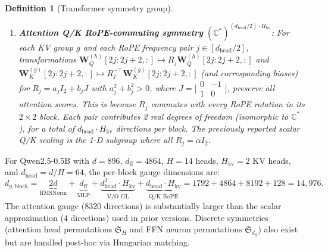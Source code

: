 \documentclass{article}
\newtheorem{definition}[theorem]{Definition}
\newcommand{\bW}{\mathbf{W}}
\begin{document}
\begin{definition}[Transformer symmetry group]
\begin{enumerate}
    \item \textbf{Attention Q/K RoPE-commuting symmetry} $(\mathbb{C}^*)^{(d_\text{head}/2) \cdot H_{\text{kv}}}$: For each KV group $g$ and each RoPE frequency pair $j \in [d_\text{head}/2]$, transformations $\bW_Q^{(h)}[2j{:}2j{+}2,:] \mapsto R_j \bW_Q^{(h)}[2j{:}2j{+}2,:]$ and $\bW_K^{(g)}[2j{:}2j{+}2,:] \mapsto R_j^{-\top}\bW_K^{(g)}[2j{:}2j{+}2,:]$ (and corresponding biases) for $R_j = a_j I_2 + b_j J$ with $a_j^2 + b_j^2 > 0$, where $J = \bigl[\begin{smallmatrix}0 & -1\\1 & 0\end{smallmatrix}\bigr]$, preserve all attention scores.  This is because $R_j$ commutes with every RoPE rotation in its $2 \times 2$ block.  Each pair contributes 2 real degrees of freedom (isomorphic to $\mathbb{C}^*$), for a total of $d_\text{head} \cdot H_{\text{kv}}$ directions per block.  The previously reported scalar Q/K scaling is the 1-D subgroup where all $R_j = \alpha I_2$.
\end{enumerate}
\end{definition}

For Qwen2.5-0.5B with $d = 896$, $d_\text{ff} = 4864$, $H=14$ heads, $H_{\text{kv}}=2$ KV heads, and $d_\text{head} = d/H = 64$, the per-block gauge dimensions are:
\begin{equation}\label{eq:gauge-count}
    d_{g,\text{block}} = \underbrace{2d}_{\text{RMSNorm}} + \underbrace{d_\text{ff}}_{\text{MLP}} + \underbrace{d_\text{head}^2 \cdot H_{\text{kv}}}_{\text{V/O GL}} + \underbrace{d_\text{head} \cdot H_{\text{kv}}}_{\text{Q/K RoPE}} = 1792 + 4864 + 8192 + 128 = 14{,}976.
\end{equation}
The attention gauge ($8320$ directions) is substantially larger than the scalar approximation ($4$ directions) used in prior versions.  Discrete symmetries (attention head permutations $\mathfrak{S}_H$ and FFN neuron permutations $\mathfrak{S}_{d_\text{ff}}$) also exist but are handled post-hoc via Hungarian matching.
\end{document}
